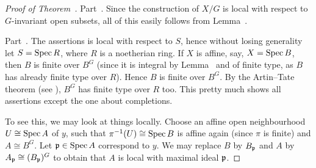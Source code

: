 \documentclass[a4paper,parskip=half,numbers=enddot, DIV=12]{scrreprt}
\begin{document}
\begin{proof}[Proof of Theorem~]
	Part~. Since the construction of $X/G$ is local with respect to $G$-invariant open subsets, all of this easily follows from Lemma~.
	
	Part~. The assertions is local with respect to $S$, hence without losing generality let $S=\operatorname{Spec} R$, where $R$ is a noetherian ring. If $X$ is affine, say, $X=\operatorname{Spec} B$, then $B$ is finite over $B^G$ (since it is integral by Lemma~ and of finite type, as $B$ has already finite type over $R$). Hence $B$ is finite over $B^G$. By the Artin--Tate theorem (see \cite[Proposition~1.4.2]{alg1}), $B^G$ has finite type over $R$ too. This pretty much shows all assertions except the one about completions.
	
	To see this, we may look at things locally. Choose an affine open neighbourhood $U\cong \operatorname{Spec} A$ of $y$, such that $\pi^{-1}(U)\cong \operatorname{Spec} B$ is affine again (since $\pi$ is finite) and $A\cong B^G$. Let $\mathfrak{p}\in\operatorname{Spec} A$ correspond to $y$. We may replace $B$ by $B_{\mathfrak{p}}$ and $A$ by $A_{\mathfrak{p}}\cong (B_{\mathfrak{p}})^G$ to obtain that $A$ is local with maximal ideal $\mathfrak{p}$.
	

\end{proof}
\end{document}
